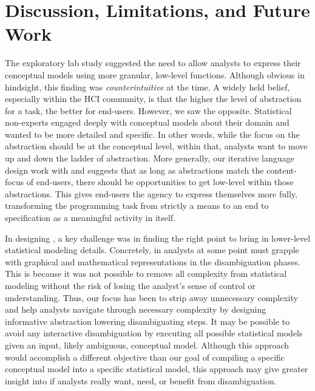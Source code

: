 \section{Discussion, Limitations, and Future Work}
The exploratory lab study suggested the need to allow analysts to express their
conceptual models using more granular, low-level functions. Although obvious in
hindsight, this finding was \textit{counterintuitive} at the time. A widely held
belief, especially within the HCI community, is that the higher the level of
abstraction for a task, the better for end-users. However, we saw the opposite.
Statistical non-experts engaged deeply with conceptual models about their domain
and wanted to be more detailed and specific. In other words, while the focus on
the abstraction should be at the conceptual level, within that, analysts want to
move up and down the ladder of abstraction. More generally, our iterative
language design work with \tisane and \rTisane suggests that as long as
abstractions match the content-focus of end-users, there should be opportunities
to get low-level within those abstractions. This gives end-users the agency to
express themselves more fully, transforming the programming task from strictly a
means to an end to specification as a meaningful activity in itself. 


In designing \rTisane, a key challenge was in finding the right point to bring
in lower-level statistical modeling details. Concretely, in \rTisane analysts at some point must grapple with graphical and
mathematical representations in the disambiguation phases. This is because it
was not possible to remove all complexity from statistical modeling without the
risk of losing the analyst's sense of control or understanding. Thus, our focus
has been to strip away unnecessary complexity and help analysts navigate through
necessary complexity by designing informative abstraction lowering
disambiguating steps. It may be possible to avoid any interactive disambiguation
by executing all possible statistical models given an input, likely ambiguous,
conceptual model. Although this approach would accomplish a different objective
than our goal of compiling a specific conceptual model into a specific
statistical model, this approach may give greater insight into if analysts
really want, need, or benefit from disambiguation. 

